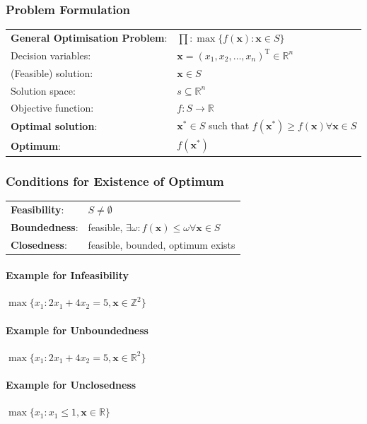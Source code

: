 \documentclass[11pt]{article}
\begin{document}
\subsubsection{Problem Formulation}
\begin{minipage}{\textwidth}
	\renewcommand{\arraystretch}{1.5}
	\begin{tabularx}{\linewidth}{l X}
		\textbf{General Optimisation Problem}: & $\prod: \max\{f(\textbf{x}):\textbf{x}\in S\}$\\
		Decision variables: & $\textbf{x} = (x_1,x_2,\dots,x_n)^{\text{T}}\in\mathbb{R}^n$\\
		(Feasible) solution: & $\textbf{x} \in S$\\
		Solution space: & $s\subseteq\mathbb{R}^n$\\
		Objective function: & $f: S\rightarrow\mathbb{R}$\\
		\textbf{Optimal solution}: & $\textbf{x}^* \in S$ such that $f(\textbf{x}^*)\geq f(\textbf{x}) \forall \textbf{x} \in S$\\
		\textbf{Optimum}: & $f(\textbf{x}^*)$
	\end{tabularx}
\end{minipage}

\subsubsection{Conditions for Existence of Optimum}
\begin{minipage}{\textwidth}
	\renewcommand{\arraystretch}{1.5}
	\begin{tabularx}{\linewidth}{l X}
		\textbf{Feasibility}: & $S\neq\emptyset$\\
		\textbf{Boundedness}: & feasible, $\exists\omega:f(\textbf{x})\leq\omega\forall \textbf{x}\in S$\\
		\textbf{Closedness}: & feasible, bounded, optimum exists
	\end{tabularx}
\end{minipage}
\paragraph{Example for Infeasibility} $\max\{x_1: 2x_1 + 4x_2 = 5, \textbf{x}\in\mathbb{Z}^2\}$
\paragraph{Example for Unboundedness} $\max\{x_1: 2x_1 + 4x_2 = 5, \textbf{x}\in\mathbb{R}^2\}$
\paragraph{Example for Unclosedness} $\max\{x_1: x_1 \leq 1, \textbf{x}\in\mathbb{R}\}$
\end{document}
